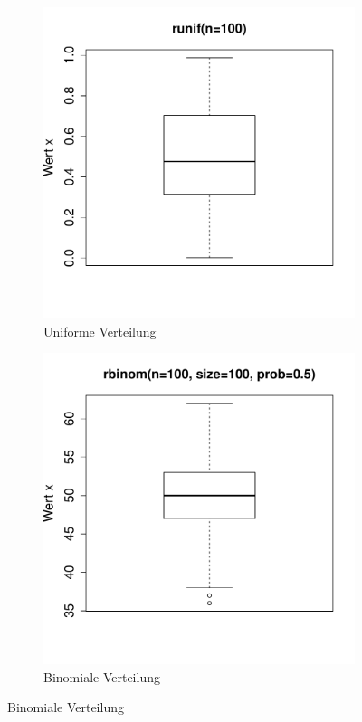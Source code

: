 \begin{figure}[h!]
\centering
\begin{subfigure}[b]{0.48\textwidth}
\includegraphics{r-cmd-021}
\caption{Uniforme Verteilung}
\end{subfigure}
\begin{subfigure}[b]{0.48\textwidth}
\includegraphics{r-cmd-022}
\caption{Binomiale Verteilung}
\end{subfigure}


\end{figure}
